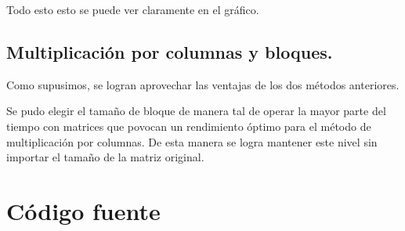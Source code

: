 \documentclass[a4paper,10pt]{article}
\begin{document}
Todo esto esto se puede ver claramente en el gráfico.

\subsection{Multiplicación por columnas y bloques.}

Como supusimos, se logran aprovechar las ventajas de los dos métodos anteriores. 

Se pudo elegir el tamaño de bloque de manera tal de operar la mayor parte del tiempo con matrices que povocan un rendimiento óptimo para el método de multiplicación por columnas. De esta manera se logra mantener este nivel sin importar el tamaño de la matriz original.

\clearpage
\section{Código fuente}
\end{document}
